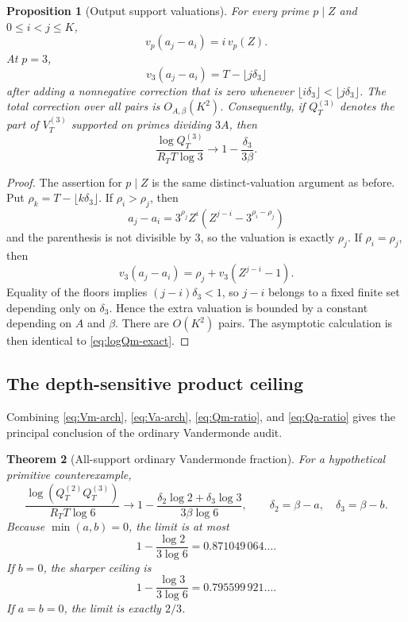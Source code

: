\documentclass[11pt,oneside]{article}
\newtheorem{theorem}{Theorem}[section]
\newtheorem{proposition}[theorem]{Proposition}
\theoremstyle{definition}
\theoremstyle{remark}
\begin{document}
\begin{proposition}[Output support valuations]\label{prop:output-vander-valuations}
For every prime $p\mid Z$ and $0\le i<j\le K$,
\[
  v_p(a_j-a_i)=i\,v_p(Z).
\]
At $p=3$,
\[
 v_3(a_j-a_i)=T-\lfloor j\delta_3\rfloor
\]
after adding a nonnegative correction that is zero whenever
$\lfloor i\delta_3\rfloor<\lfloor j\delta_3\rfloor$.  The total correction over all pairs is
$O_{A,\beta}(K^2)$.  Consequently, if $Q_T^{(3)}$ denotes the part of
$V_T^{(3)}$ supported on primes dividing $3A$, then
\begin{equation}\label{eq:Qa-ratio}
  \frac{\log Q_T^{(3)}}{R_TT\log3}
  \longrightarrow
  1-\frac{\delta_3}{3\beta}.
\end{equation}
\end{proposition}

\begin{proof}
The assertion for $p\mid Z$ is the same distinct-valuation argument as before.  Put
$\rho_k=T-\lfloor k\delta_3\rfloor$.  If $\rho_i>\rho_j$, then
\[
 a_j-a_i=3^{\rho_j}Z^i
 \left(Z^{j-i}-3^{\rho_i-\rho_j}\right)
\]
and the parenthesis is not divisible by $3$, so the valuation is exactly $\rho_j$.  If
$\rho_i=\rho_j$, then
\[
 v_3(a_j-a_i)=\rho_j+v_3(Z^{j-i}-1).
\]
Equality of the floors implies $(j-i)\delta_3<1$, so $j-i$ belongs to a fixed finite set
depending only on $\delta_3$.  Hence the extra valuation is bounded by a constant depending on
$A$ and $\beta$.  There are $O(K^2)$ pairs.  The asymptotic calculation is then identical to
\eqref{eq:logQm-exact}.
\end{proof}

\subsection{The depth-sensitive product ceiling}

Combining \eqref{eq:Vm-arch}, \eqref{eq:Va-arch},
\eqref{eq:Qm-ratio}, and \eqref{eq:Qa-ratio} gives the principal conclusion of the ordinary
Vandermonde audit.

\begin{theorem}[All-support ordinary Vandermonde fraction]\label{thm:ordinary-fraction}
For a hypothetical primitive counterexample,
\begin{equation}\label{eq:ordinary-fraction}
 \frac{\log(Q_T^{(2)}Q_T^{(3)})}{R_TT\log6}
 \longrightarrow
 1-\frac{\delta_2\log2+\delta_3\log3}{3\beta\log6},
 \qquad
 \delta_2=\beta-a,
 \quad
 \delta_3=\beta-b.
\end{equation}
Because $\min(a,b)=0$, the limit is at most
\begin{equation}\label{eq:ordinary-universal-ceiling}
 1-\frac{\log2}{3\log6}
 =0.871049\,064\ldots.
\end{equation}
If $b=0$, the sharper ceiling is
\[
 1-\frac{\log3}{3\log6}=0.795599\,921\ldots.
\]
If $a=b=0$, the limit is exactly $2/3$.
\end{theorem}
\end{document}
